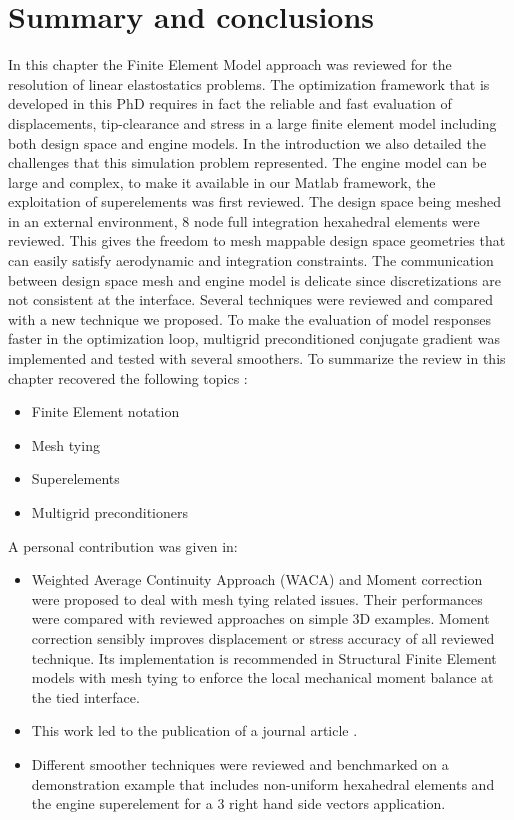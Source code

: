 \section{Summary and conclusions}      
In this chapter the Finite Element Model approach was reviewed for the resolution of linear elastostatics problems. The optimization framework that is developed in this PhD requires in fact the reliable and fast evaluation of displacements, tip-clearance and stress in a large finite element model including both design space and engine models. In the introduction we also detailed the challenges that this simulation problem represented.  The engine model can be large and complex, to make it available in our Matlab framework, the exploitation of superelements was first reviewed. The design space being meshed in an external environment, 8 node full integration hexahedral elements were reviewed. This gives the freedom to mesh mappable design space geometries that can easily satisfy aerodynamic and integration constraints. The communication between design space mesh and engine model is delicate since discretizations are not consistent at the interface. Several techniques were reviewed and compared with  a new technique we proposed. To make the evaluation of model responses faster in the optimization loop, multigrid preconditioned conjugate gradient was implemented and tested with several smoothers. To summarize the review in this chapter recovered the following topics :
\begin{itemize}
\item Finite Element notation
\item Mesh tying
\item Superelements
\item Multigrid preconditioners
\end{itemize}
A personal contribution was given in:
\begin{itemize}
\item Weighted Average Continuity Approach (WACA) and Moment correction were proposed to deal with mesh tying related issues. Their performances were compared with reviewed approaches on simple 3D examples. Moment correction sensibly improves displacement or stress accuracy of all reviewed technique. Its implementation is recommended in Structural Finite Element models with mesh tying to enforce the local mechanical moment balance at the tied interface. 
\item This work led to the publication of a journal article \cite{coniglio2018weighted}.
\item Different smoother techniques were reviewed and benchmarked on a  demonstration example that includes non-uniform hexahedral elements and the engine superelement for a 3 right hand side vectors application.
\end{itemize}
